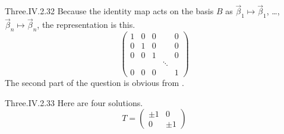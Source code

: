\begin{ans}{Three.IV.2.32}
      Because the identity map acts on the basis $B$ as
      $\vec{\beta}_1\mapsto\vec{\beta}_1$, \ldots,
      $\vec{\beta}_n\mapsto\vec{\beta}_n$,
      the representation is this.
      \begin{equation*}
        \begin{pmatrix}
          1  &0  &0  &  &0 \\
          0  &1  &0  &  &0 \\
          0  &0  &1  &  &0 \\
             &   &   &\ddots  \\
          0  &0  &0  &  &1
        \end{pmatrix}
      \end{equation*}
      The second part of the question is obvious from
      .
    
\end{ans}
\begin{ans}{Three.IV.2.33}
      Here are four solutions.
      \begin{equation*}
        T=\begin{pmatrix}
          \pm 1  &0  \\
          0      &\pm 1
        \end{pmatrix}
      \end{equation*}
    
\end{ans}
